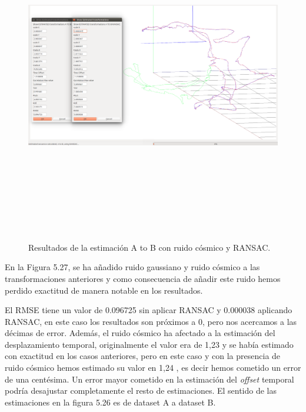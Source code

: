 \begin{figure}[H]
\begin{center}
\label{fig:opciones de View}\includegraphics[height=14.0cm,width=18.0cm]{img/cap6/newData_EscalaTraslaRotaGaussCosmic_ab.png}
\hspace{0.5cm}
\end{center}

\caption{Resultados de la estimación A to B con ruido cósmico y RANSAC.}
\end{figure}
En la Figura 5.27, se ha añadido ruido gaussiano y ruido cósmico a las transformaciones anteriores y como consecuencia de añadir este ruido hemos perdido exactitud de manera notable en los resultados. 

El RMSE tiene un valor de 0.096725 sin aplicar RANSAC y 0.000038 aplicando RANSAC, en este caso los resultados son próximos a 0, pero nos acercamos a las décimas de error.
Además, el ruido cósmico ha afectado a la estimación del desplazamiento temporal, originalmente el valor era de 1,23 y se había estimado con exactitud en los casos anteriores, pero en este caso y con la presencia de ruido cósmico hemos estimado su valor en 1,24 , es decir hemos cometido un error de una centésima. Un error mayor cometido en la estimación del \textit{offset} temporal podría desajustar completamente el resto de estimaciones.
El sentido de las estimaciones en la figura 5.26 es de dataset A a dataset B.


